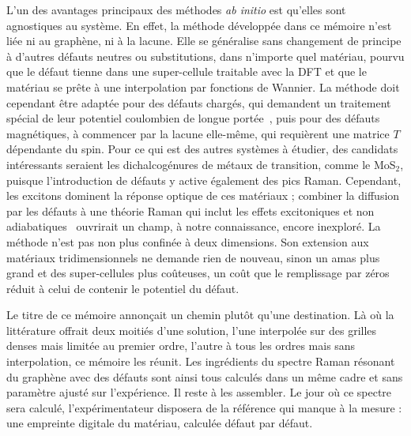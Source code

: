 L'un des avantages principaux des méthodes \textit{ab initio} est qu'elles sont agnostiques au système. En effet, la méthode développée dans ce mémoire n'est liée ni au graphène, ni à la lacune. Elle se généralise sans changement de principe à d'autres défauts neutres ou substitutions, dans n'importe quel matériau, pourvu que le défaut tienne dans une super-cellule traitable avec la DFT et que le matériau se prête à une interpolation par fonctions de Wannier. La méthode doit cependant être adaptée pour des défauts chargés, qui demandent un traitement spécial de leur potentiel coulombien de longue portée~\cite{luFirstprinciplesIonizedimpurityScattering2021}, puis pour des défauts magnétiques, à commencer par la lacune elle-même, qui requièrent une matrice $T$ dépendante du spin. Pour ce qui est des autres systèmes à étudier, des candidats intéressants seraient les dichalcogénures de métaux de transition, comme le MoS$_2$, puisque l'introduction de défauts y active également des pics Raman. Cependant, les excitons dominent la réponse optique de ces matériaux ; combiner la diffusion par les défauts à une théorie Raman qui inclut les effets excitoniques et non adiabatiques~\cite{reichardtTheoryResonantRaman2019,reichardtNonadiabaticExcitonphononCoupling2020} ouvrirait un champ, à notre connaissance, encore inexploré. La méthode n'est pas non plus confinée à deux dimensions. Son extension aux matériaux tridimensionnels ne demande rien de nouveau, sinon un amas plus grand et des super-cellules plus coûteuses, un coût que le remplissage par zéros réduit à celui de contenir le potentiel du défaut.

\bigskip
\bigskip
\bigskip
Le titre de ce mémoire annonçait un chemin plutôt qu'une destination. Là où la littérature offrait deux moitiés d'une solution, l'une interpolée sur des grilles denses mais limitée au premier ordre, l'autre à tous les ordres mais sans interpolation, ce mémoire les réunit. Les ingrédients du spectre Raman résonant du graphène avec des défauts sont ainsi tous calculés dans un même cadre et sans paramètre ajusté sur l'expérience. Il reste à les assembler. Le jour où ce spectre sera calculé, l'expérimentateur disposera de la référence qui manque à la mesure : une empreinte digitale du matériau, calculée défaut par défaut.